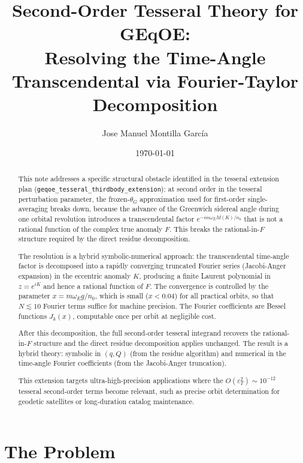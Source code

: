 \documentclass[11pt]{article}
\title{Second-Order Tesseral Theory for GEqOE:\\
\large Resolving the Time-Angle Transcendental via
Fourier-Taylor Decomposition}
\author{Jose Manuel Montilla Garc\'ia}
\date{\today}
\newcommand{\eps}{\varepsilon}
\newcommand{\tesseral}{geqoe\_tesseral\_thirdbody\_extension}
\begin{document}
\maketitle

\begin{abstract}
This note addresses a specific structural obstacle identified in the
tesseral extension plan (\texttt{\tesseral{}}): at second order in the
tesseral perturbation parameter, the frozen-$\theta_G$ approximation used
for first-order single-averaging breaks down, because the advance of the
Greenwich sidereal angle during one orbital revolution introduces a
transcendental factor $e^{-im\omega_E M(K)/n_0}$ that is not a rational
function of the complex true anomaly $F$. This breaks the
rational-in-$F$ structure required by the direct residue decomposition.

The resolution is a hybrid symbolic-numerical approach: the transcendental
time-angle factor is decomposed into a rapidly converging truncated
Fourier series (Jacobi-Anger expansion) in the eccentric anomaly $K$,
producing a finite Laurent polynomial in $z = e^{iK}$ and hence a
rational function of $F$. The convergence is controlled by the parameter
$x = m\omega_E g / n_0$, which is small ($x < 0.04$) for all practical
orbits, so that $N \lesssim 10$ Fourier terms suffice for machine
precision. The Fourier coefficients are Bessel functions $J_k(x)$,
computable once per orbit at negligible cost.

After this decomposition, the full second-order tesseral integrand
recovers the rational-in-$F$ structure and the direct residue
decomposition applies unchanged. The result is a hybrid theory:
symbolic in $(q, Q)$ (from the residue algorithm) and numerical in the
time-angle Fourier coefficients (from the Jacobi-Anger truncation).

This extension targets ultra-high-precision applications where the
$O(\eps_T^2) \sim 10^{-12}$ tesseral second-order terms become relevant,
such as precise orbit determination for geodetic satellites or
long-duration catalog maintenance.
\end{abstract}

\tableofcontents


\section{The Problem}
\label{sec:problem}
\end{document}

